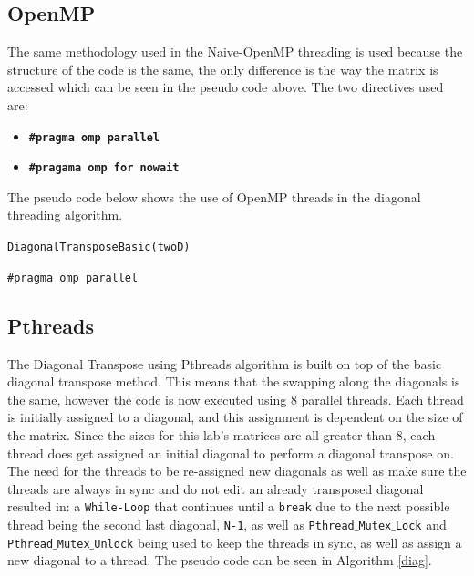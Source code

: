 \documentclass[conference]{IEEEtran}
\begin{document}
\subsection{OpenMP}
The same methodology used in the Naive-OpenMP threading is used because the structure of the code is the same, the only difference is the way the matrix is accessed which can be seen in the pseudo code above. The two directives used are:

\begin{itemize}
    \item \texttt{\textbf{\#pragma omp parallel}}
    \item \texttt{\textbf{\#pragama omp for nowait}}
\end{itemize}

The pseudo code below shows the use of OpenMP threads in the diagonal threading algorithm.
\begin{algorithm}





\caption{\texttt{DiagonalTransposeBasic(twoD)}}
\texttt{\#pragma omp parallel}\\
\label{basic}
\end{algorithm}


\subsection{Pthreads}
The Diagonal Transpose using Pthreads algorithm is built on top of the basic diagonal transpose method. This means that the swapping along the diagonals is the same, however the code is now executed using 8 parallel threads. Each thread is initially assigned to a diagonal, and this assignment is dependent on the size of the matrix. Since the sizes for this lab's matrices are all greater than 8, each thread does get assigned an initial diagonal to perform a diagonal transpose on. The need for the threads to be re-assigned new diagonals as well as make sure the threads are always in sync and do not edit an already transposed diagonal resulted in: a \texttt{While-Loop} that continues  until a \texttt{break} due to the next possible thread being the second last diagonal, \texttt{N-1}, as well as \texttt{Pthread$\_$Mutex$\_$Lock} and \texttt{Pthread$\_$Mutex$\_$Unlock} being used to keep the threads in sync, as well as assign a new diagonal to a thread. The pseudo code can be seen in Algorithm \ref{diag}.
\end{document}
